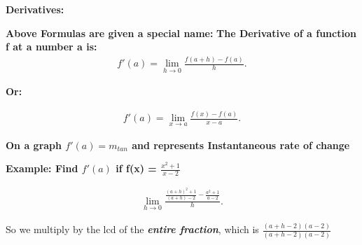 \documentclass{report}
\begin{document}
        \pagebreak \bigbreak \noindent
        \begin{large}
            \textbf{Derivatives:}
        \end{large}
        \bigbreak \noindent \bigbreak \noindent \bigbreak \noindent   
        \textbf{Above Formulas are given a special name:}
        \bigbreak \noindent 
        \textbf{The Derivative of a function f at a number a is:}
        \begin{align*}
            f\prime (a) = \lim\limits_{h \to 0}{ \frac{f(a+h) - f(a)}{h}}
        .\end{align*}
        \bigbreak \noindent 
        \begin{center}
            \textbf{Or:}
        \end{center}
        \begin{align*}
            f\prime (a) = \lim\limits_{x \to a}{ \frac{f(x) - f(a)}{x -a }}
        .\end{align*}

        \bigbreak \noindent 
        \textbf{On a graph $f\prime (a) = m_{tan}$ and represents Instantaneous rate of change}

        \bigbreak \noindent \bigbreak \noindent 
        \begin{large}
            \textbf{Example: Find $f\prime (a)$ if f(x) = $\frac{x^2+1}{x-2}$}
        \end{large}
        
        \bigbreak \noindent \bigbreak \noindent 
        \begin{align*}
            \lim\limits_{h \to 0}{ \frac{ \frac{ \left(a+h\right)^2 + 1}{ \left(a+h\right)-2} - \frac{a^2+1}{a-2}}{h}}
        .\end{align*}

        \bigbreak \noindent 
        So we multiply by the lcd of the \textbf{\textit{entire fraction}}, which is $ \frac{ \left(a+h-2\right) \left(a-2\right)}{ \left(a+h-2\right) \left(a-2\right)}$
\end{document}
